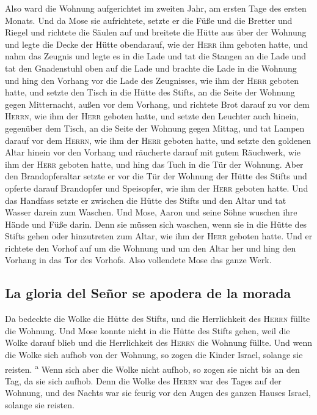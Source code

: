 Also ward die Wohnung aufgerichtet im zweiten Jahr, am
ersten Tage des ersten Monats.  Und da Mose sie
aufrichtete, setzte er die Füße und die Bretter und Riegel und richtete
die Säulen auf  und breitete die Hütte aus über der
Wohnung und legte die Decke der Hütte obendarauf, wie der \textsc{Herr}
ihm geboten hatte,  und nahm das Zeugnis und legte es in
die Lade und tat die Stangen an die Lade und tat den Gnadenstuhl oben
auf die Lade  und brachte die Lade in die Wohnung und
hing den Vorhang vor die Lade des Zeugnisses, wie ihm der \textsc{Herr}
geboten hatte,  und setzte den Tisch in die Hütte des
Stifts, an die Seite der Wohnung gegen Mitternacht, außen vor dem
Vorhang,  und richtete Brot darauf zu vor dem
\textsc{Herrn}, wie ihm der \textsc{Herr} geboten hatte, 
und setzte den Leuchter auch hinein, gegenüber dem Tisch, an die Seite
der Wohnung gegen Mittag,  und tat Lampen darauf vor dem
\textsc{Herrn}, wie ihm der \textsc{Herr} geboten hatte, 
und setzte den goldenen Altar hinein vor den Vorhang  und
räucherte darauf mit gutem Räuchwerk, wie ihm der \textsc{Herr} geboten
hatte,  und hing das Tuch in die Tür der Wohnung.
 Aber den Brandopferaltar setzte er vor die Tür der
Wohnung der Hütte des Stifts und opferte darauf Brandopfer und
Speisopfer, wie ihm der \textsc{Herr} geboten hatte.  Und
das Handfass setzte er zwischen die Hütte des Stifts und den Altar und
tat Wasser darein zum Waschen.  Und Mose, Aaron und seine
Söhne wuschen ihre Hände und Füße darin.  Denn sie müssen
sich waschen, wenn sie in die Hütte des Stifts gehen oder hinzutreten
zum Altar, wie ihm der \textsc{Herr} geboten hatte.  Und
er richtete den Vorhof auf um die Wohnung und um den Altar her und hing
den Vorhang in das Tor des Vorhofs. Also vollendete Mose das ganze Werk.

\hypertarget{la-gloria-del-seuxf1or-se-apodera-de-la-morada}{%
\subsection{La gloria del Señor se apodera de la
morada}\label{la-gloria-del-seuxf1or-se-apodera-de-la-morada}}

 Da bedeckte die Wolke die Hütte des Stifts, und die
Herrlichkeit des \textsc{Herrn} füllte die Wohnung.  Und
Mose konnte nicht in die Hütte des Stifts gehen, weil die Wolke darauf
blieb und die Herrlichkeit des \textsc{Herrn} die Wohnung füllte.
 Und wenn die Wolke sich aufhob von der Wohnung, so zogen
die Kinder Israel, solange sie reisten. \textsuperscript{a}
 Wenn sich aber die Wolke nicht aufhob, so zogen sie
nicht bis an den Tag, da sie sich aufhob.  Denn die Wolke
des \textsc{Herrn} war des Tages auf der Wohnung, und des Nachts war sie
feurig vor den Augen des ganzen Hauses Israel, solange sie reisten.
